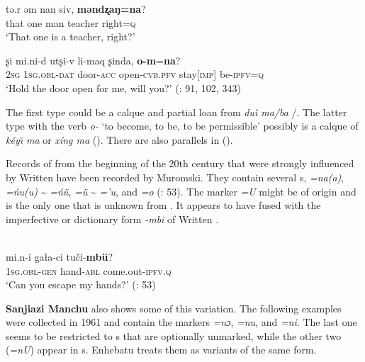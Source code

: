     \ex
    \gll tə.{r} əm nan siv, \textbf{{məndʐaŋ}}\textbf{{=}}\textbf{{na}}?\\
    that  one  man  teacher    right=\textsc{q}\\
    \glt ‘That one is a teacher, right?’
    
    \ex
    \gll ʂi mi.{ni-}{d} {utʂi-}{v} {li-}{maq} ʂinda, \textbf{{o}}\textbf{{-}}\textbf{{m}}{=}\textbf{{na}}?\\
    2\textsc{sg}  1\textsc{sg}.\textsc{obl}-\textsc{dat}  door-\textsc{acc} open-\textsc{cvb}.\textsc{pfv}  stay[\textsc{imp]} be-\textsc{ipfv}=\textsc{q}\\
    \glt ‘Hold the door open for me, will you?’ (\citealt{Chaoke2006}: 91, 102, 343)\z\z

The first type could be a calque and partial loan from  \textit{duì ma/ba} /. The latter type with the verb \textit{o-} ‘to become, to be, to be permissible’ \citep{Norman2013} possibly is a calque of  \textit{kĕy\u{\i} ma}  or \textit{xíng ma}  (). There are also parallels in   ().

Records of  from the beginning of the 20th century that were strongly influenced by Written  have been recorded by Muromski. They contain several s, \textit{=na(a)}, \textit{=ńu(u)} {\textasciitilde} \textit{=ńü}, \textit{=ü} {\textasciitilde} \textit{=’u}, and \textit{=o} (\citealt{Kałużyński1977}: 53). The marker \textit{=U} might be of  origin and is the only one that is unknown from . It appears to have fused with the imperfective or dictionary form \textit{-mbi} of Written .

\ea%
    \label{ex:tungu:69}
    \\
    \gll mi.n-i    gała-ci    tuči-\textbf{{mbü}}?\\
    1\textsc{sg}.\textsc{obl}-\textsc{gen}  hand-\textsc{abl}  come.out-\textsc{ipfv}.\textsc{q}\\
    \glt ‘Can you escape my hands?’ (\citealt{Kałużyński1977}: 53)
    \z

\textbf{Sanjiazi Manchu} also shows some of this variation. The following examples were collected in 1961 and contain the markers \textit{=nɔ}, \textit{=nu}, and \textit{=ni}. The last one seems to be restricted to s that are optionally unmarked, while the other two (\textit{=nU}) appear in s. Enhebatu treats them as variants of the same form.

